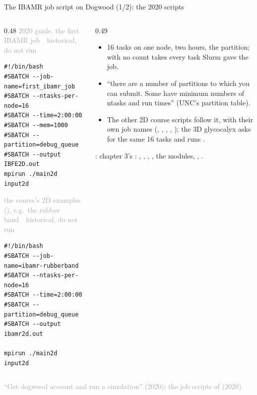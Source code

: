 \documentclass[aspectratio=169,11pt]{beamer}
\newcommand{\sourcecredit}[1]{\vfill\begin{flushright}\tiny\textcolor{DarkGray}{#1}\end{flushright}}
\newcommand{\hist}[1]{{\tiny\sffamily\textcolor{DarkGray}{#1\ \textbullet\ historical, do not run}}\par\nointerlineskip\vspace{0.3mm}}
\begin{document}
\begin{frame}[fragile]{The IBAMR job script on Dogwood (1/2): the 2020 scripts}
\label{fr:dwjob}
\begin{columns}[T,onlytextwidth]
\begin{column}{0.48\textwidth}
\hist{2020 guide, the first IBAMR job}
\begin{lstlisting}[style=hist]
#!/bin/bash
#SBATCH --job-name=first_ibamr_job
#SBATCH --ntasks-per-node=16
#SBATCH --time=2:00:00
#SBATCH --mem=1000
#SBATCH --partition=debug_queue
#SBATCH --output IBFE2D.out
mpirun ./main2d input2d
\end{lstlisting}
\hist{the course's 2D examples (), e.g.\ the rubber band}
\begin{lstlisting}[style=hist]
#!/bin/bash
#SBATCH --job-name=ibamr-rubberband
#SBATCH --ntasks-per-node=16
#SBATCH --time=2:00:00
#SBATCH --partition=debug_queue
#SBATCH --output ibamr2d.out

mpirun ./main2d input2d
\end{lstlisting}
\end{column}
\begin{column}{0.49\textwidth}
\footnotesize
\begin{itemize}\setlength{\itemsep}{2pt}
  \item 16 tasks on one node, two hours, the  partition;  with no count takes every task Slurm gave the job.
  \item ``there are a number of partitions to which you can submit. Some have minimum numbers of ntasks and run times'' (UNC's partition table).
  \item The other 2D course scripts follow it, with their own job names (, , , , ); the 3D glycocalyx asks for the same 16 tasks and runs .
\end{itemize}
\vspace{1mm}
: chapter 3's : , , , , the modules, , .
\end{column}
\end{columns}
\sourcecredit{``Get dogwood account and run a simulation'' (2020); the job scripts of \code{examples/legacy/UNC-Examples} (2020).}
\end{frame}
\end{document}

